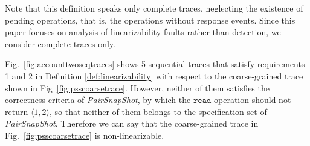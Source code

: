 \documentclass[runningheads]{llncs}
\newcommand{\pair}[1]{{\langle{#1}\rangle}}
\begin{document}
Note that this definition speaks only complete traces, neglecting the existence of pending operations, that is, the operations without response events. Since this paper focuses on analysis of linearizability faults rather than detection, we consider complete traces only.

\begin{example}
Fig.~\ref{fig:accounttwoseqtraces} shows 5 sequential traces that satisfy requirements 1 and 2 in Definition \ref{def:linearizability} with respect to the coarse-grained trace shown in Fig~\ref{fig:psscoarsetrace}. However, neither of them satisfies the correctness criteria of \textit{PairSnapShot}, by which the $\mathtt{read}$ operation should not return $\pair{1,2}$, so that neither of them belongs to the specification set of \textit{PairSnapShot}. Therefore we can say that the coarse-grained trace in Fig.~\ref{fig:psscoarsetrace} is non-linearizable.
\end{example}
\end{document}
